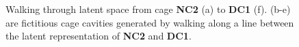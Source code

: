 \documentclass[journal=jacsat,manuscript=article,layout=traditional]{achemso}
\begin{document}
\begin{figure}
\centering
		\caption{Walking through latent space from cage \textbf{NC2} (a) to \textbf{DC1} (f). (b-e) are fictitious cage cavities generated by walking along a line between the latent representation of \textbf{NC2} and \textbf{DC1}.
	} \label{fig:walk_in_latent_space}
\end{figure}
\end{document}
